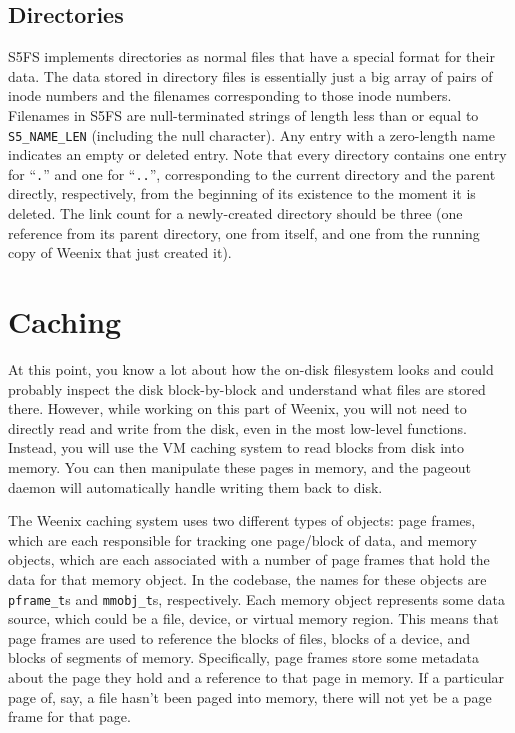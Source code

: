 \subsection{Directories} \label{directories}

S5FS implements directories as normal files that have a special format for their data. The data stored in directory files is essentially just a big array of pairs of inode numbers and the filenames corresponding to those inode numbers. Filenames in S5FS are null-terminated strings of length less than or equal to \texttt{S5\_NAME\_LEN} (including the null character). Any entry with a zero-length name indicates an empty or deleted entry. Note that every directory contains one entry for ``\texttt{.}'' and one for ``\texttt{..}'', corresponding to the current directory and the parent directly, respectively, from the beginning of its existence to the moment it is deleted. The link count for a newly-created directory should be three (one reference from its parent directory, one from itself, and one from the running copy of Weenix that just created it).

\section{Caching}

At this point, you know a lot about how the on-disk filesystem looks and could probably inspect the disk block-by-block and understand what files are stored there. However, while working on this part of Weenix, you will not need to directly read and write from the disk, even in the most low-level functions. Instead, you will use the VM caching system to read blocks from disk into memory. You can then manipulate these pages in memory, and the pageout daemon will automatically handle writing them back to disk.

The Weenix caching system uses two different types of objects: page frames, which are each responsible for tracking one page/block of data, and memory objects, which are each associated with a number of page frames that hold the data for that memory object. In the codebase, the names for these objects are \texttt{pframe\_t}s and \texttt{mmobj\_t}s, respectively. Each memory object represents some data source, which could be a file, device, or virtual memory region. This means that page frames are used to reference the blocks of files, blocks of a device, and blocks of segments of memory. Specifically, page frames store some metadata about the page they hold and a reference to that page in memory. If a particular page of, say, a file hasn't been paged into memory, there will not yet be a page frame for that page.

